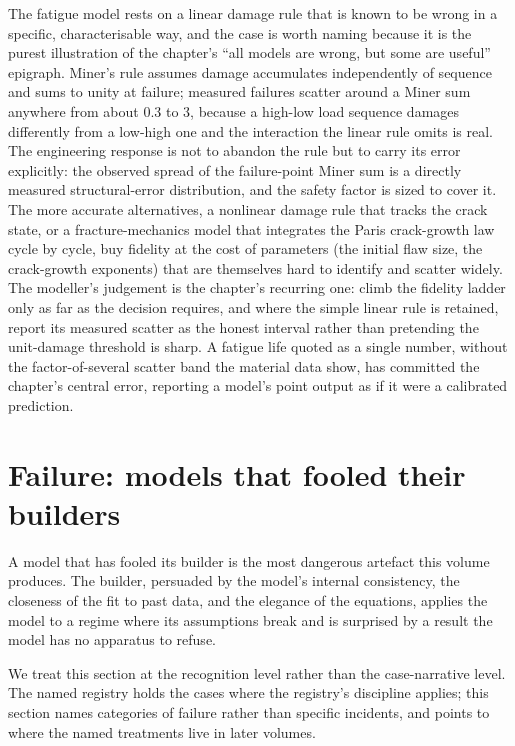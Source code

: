 \begin{mastery}
The fatigue model rests on a linear damage rule that is known to be wrong in a
specific, characterisable way, and the case is worth naming because it is the
purest illustration of the chapter's ``all models are wrong, but some are
useful'' epigraph. Miner's rule assumes damage accumulates independently of
sequence and sums to unity at failure; measured failures scatter around a Miner
sum anywhere from about $0.3$ to $3$, because a high-low load sequence damages
differently from a low-high one and the interaction the linear rule omits is real.
The engineering response is not to abandon the rule but to carry its error
explicitly: the observed spread of the failure-point Miner sum is a directly
measured structural-error distribution, and the safety factor is sized to cover
it. The more accurate alternatives, a nonlinear damage rule that tracks the crack
state, or a fracture-mechanics model that integrates the Paris crack-growth law
\cite{text:hertzberg-fatigue} cycle by cycle, buy fidelity at the cost of
parameters (the initial flaw size, the crack-growth exponents) that are themselves
hard to identify and scatter widely. The modeller's judgement is the chapter's
recurring one: climb the fidelity ladder only as far as the decision requires, and
where the simple linear rule is retained, report its measured scatter as the honest
interval rather than pretending the unit-damage threshold is sharp. A fatigue life
quoted as a single number, without the factor-of-several scatter band the material
data show, has committed the chapter's central error, reporting a model's point
output as if it were a calibrated prediction.
\end{mastery}

\section{Failure: models that fooled their builders}

A model that has fooled its builder is the most dangerous artefact
this volume produces. The builder, persuaded by the model's
internal consistency, the closeness of the fit to past data, and
the elegance of the equations, applies the model to a regime where
its assumptions break and is surprised by a result the model has
no apparatus to refuse.

We treat this section at the recognition level rather than the
case-narrative level. The named registry holds the cases where
the registry's discipline applies; this section names categories
of failure rather than specific incidents, and points to where
the named treatments live in later volumes.

